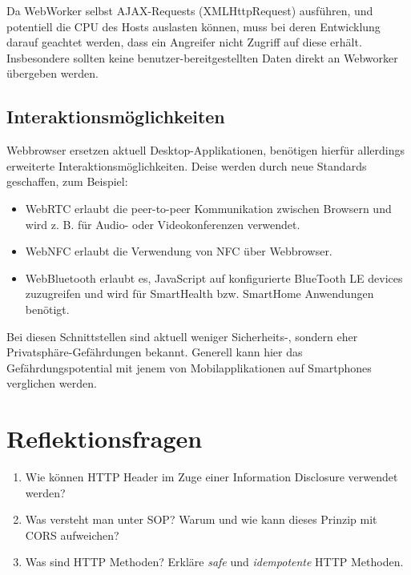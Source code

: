 Da WebWorker selbst AJAX-Requests (XMLHttpRequest) ausführen, und potentiell die CPU des Hosts auslasten können, muss bei deren Entwicklung darauf geachtet werden, dass ein Angreifer nicht Zugriff auf diese erhält. Insbesondere sollten keine benutzer-bereitgestellten Daten direkt an Webworker übergeben werden.

\subsection{Interaktionsmöglichkeiten}

Webbrowser ersetzen aktuell Desktop-Applikationen, benötigen hierfür allerdings erweiterte Interaktionsmöglichkeiten. Deise werden durch neue Standards geschaffen, zum Beispiel:

\begin{itemize}
	\item WebRTC erlaubt die peer-to-peer Kommunikation zwischen Browsern und wird z. B. für Audio- oder Videokonferenzen verwendet.
	\item WebNFC erlaubt die Verwendung von NFC über Webbrowser.
	\item WebBluetooth erlaubt es, JavaScript auf konfigurierte BlueTooth LE devices zuzugreifen und wird für SmartHealth bzw. SmartHome Anwendungen benötigt.
\end{itemize}

Bei diesen Schnittstellen sind aktuell weniger Sicherheits-, sondern eher Privatsphäre-Gefährdungen bekannt. Generell kann hier das Gefährdungspotential mit jenem von Mobilapplikationen auf Smartphones verglichen werden.

\section{Reflektionsfragen}

\begin{enumerate}
	\item Wie können HTTP Header im Zuge einer Information Disclosure verwendet werden?
	\item Was versteht man unter SOP? Warum und wie kann dieses Prinzip mit CORS aufweichen?
	\item Was sind HTTP Methoden? Erkläre \textit{safe} und \textit{idempotente} HTTP Methoden.
\end{enumerate}

